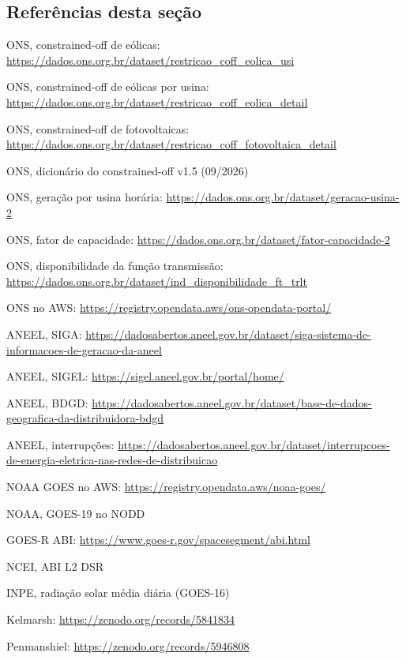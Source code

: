 \subsection*{Referências desta seção}
{\small
\begin{enumerate}[label={[\arabic*]},leftmargin=2.2em,itemsep=1pt]
\item ONS, constrained-off de eólicas: \url{https://dados.ons.org.br/dataset/restricao_coff_eolica_usi}
\item ONS, constrained-off de eólicas por usina: \url{https://dados.ons.org.br/dataset/restricao_coff_eolica_detail}
\item ONS, constrained-off de fotovoltaicas: \url{https://dados.ons.org.br/dataset/restricao_coff_fotovoltaica_detail}
\item ONS, dicionário do constrained-off v1.5 (09/2026)
\item ONS, geração por usina horária: \url{https://dados.ons.org.br/dataset/geracao-usina-2}
\item ONS, fator de capacidade: \url{https://dados.ons.org.br/dataset/fator-capacidade-2}
\item ONS, disponibilidade da função transmissão: \url{https://dados.ons.org.br/dataset/ind_disponibilidade_ft_trlt}
\item ONS no AWS: \url{https://registry.opendata.aws/ons-opendata-portal/}
\item ANEEL, SIGA: \url{https://dadosabertos.aneel.gov.br/dataset/siga-sistema-de-informacoes-de-geracao-da-aneel}
\item ANEEL, SIGEL: \url{https://sigel.aneel.gov.br/portal/home/}
\item ANEEL, BDGD: \url{https://dadosabertos.aneel.gov.br/dataset/base-de-dados-geografica-da-distribuidora-bdgd}
\item ANEEL, interrupções: \url{https://dadosabertos.aneel.gov.br/dataset/interrupcoes-de-energia-eletrica-nas-redes-de-distribuicao}
\item NOAA GOES no AWS: \url{https://registry.opendata.aws/noaa-goes/}
\item NOAA, GOES-19 no NODD
\item GOES-R ABI: \url{https://www.goes-r.gov/spacesegment/abi.html}
\item NCEI, ABI L2 DSR
\item INPE, radiação solar média diária (GOES-16)
\item Kelmarsh: \url{https://zenodo.org/records/5841834}
\item Penmanshiel: \url{https://zenodo.org/records/5946808}

\end{enumerate}}
